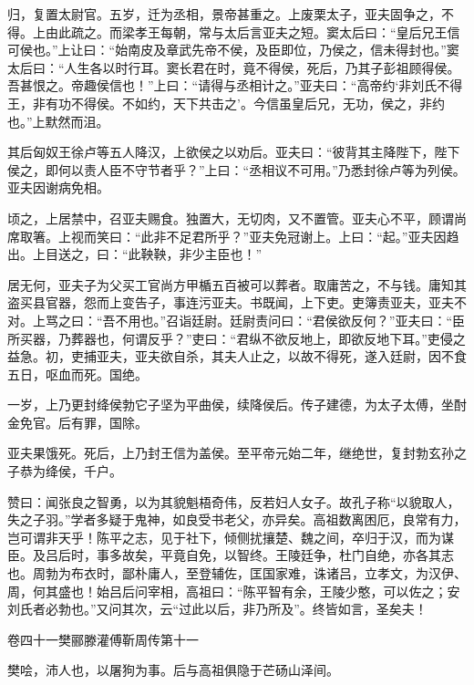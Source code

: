 \documentclass[12pt,UTF8]{ctexbook}
\begin{document}
归，复置太尉官。五岁，迁为丞相，景帝甚重之。上废栗太子，亚夫固争之，不得。上由此疏之。而梁孝王每朝，常与太后言亚夫之短。窦太后曰：“皇后兄王信可侯也。”上让曰：“始南皮及章武先帝不侯，及臣即位，乃侯之，信未得封也。”窦太后曰：“人生各以时行耳。窦长君在时，竟不得侯，死后，乃其子彭祖顾得侯。吾甚恨之。帝趣侯信也！”上曰：“请得与丞相计之。”亚夫曰：“高帝约‘非刘氏不得王，非有功不得侯。不如约，天下共击之’。今信虽皇后兄，无功，侯之，非约也。”上默然而沮。



其后匈奴王徐卢等五人降汉，上欲侯之以劝后。亚夫曰：“彼背其主降陛下，陛下侯之，即何以责人臣不守节者乎？”上曰：“丞相议不可用。”乃悉封徐卢等为列侯。亚夫因谢病免相。



顷之，上居禁中，召亚夫赐食。独置大，无切肉，又不置管。亚夫心不平，顾谓尚席取箸。上视而笑曰：“此非不足君所乎？”亚夫免冠谢上。上曰：“起。”亚夫因趋出。上目送之，曰：“此鞅鞅，非少主臣也！”



居无何，亚夫子为父买工官尚方甲楯五百被可以葬者。取庸苦之，不与钱。庸知其盗买县官器，怨而上变告子，事连污亚夫。书既闻，上下吏。吏簿责亚夫，亚夫不对。上骂之曰：“吾不用也。”召诣廷尉。廷尉责问曰：“君侯欲反何？”亚夫曰：“臣所买器，乃葬器也，何谓反乎？”吏曰：“君纵不欲反地上，即欲反地下耳。”吏侵之益急。初，吏捕亚夫，亚夫欲自杀，其夫人止之，以故不得死，遂入廷尉，因不食五日，呕血而死。国绝。



一岁，上乃更封绛侯勃它子坚为平曲侯，续降侯后。传子建德，为太子太傅，坐酎金免官。后有罪，国除。



亚夫果饿死。死后，上乃封王信为盖侯。至平帝元始二年，继绝世，复封勃玄孙之子恭为绛侯，千户。



赞曰：闻张良之智勇，以为其貌魁梧奇伟，反若妇人女子。故孔子称“以貌取人，失之子羽。”学者多疑于鬼神，如良受书老父，亦异矣。高祖数离困厄，良常有力，岂可谓非天乎！陈平之志，见于社下，倾侧扰攘楚、魏之间，卒归于汉，而为谋臣。及吕后时，事多故矣，平竟自免，以智终。王陵廷争，杜门自绝，亦各其志也。周勃为布衣时，鄙朴庸人，至登辅佐，匡国家难，诛诸吕，立孝文，为汉伊、周，何其盛也！始吕后问宰相，高祖曰：“陈平智有余，王陵少憨，可以佐之；安刘氏者必勃也。”又问其次，云“过此以后，非乃所及”。终皆如言，圣矣夫！





卷四十一樊郦滕灌傅靳周传第十一



樊哙，沛人也，以屠狗为事。后与高祖俱隐于芒砀山泽间。
\end{document}
